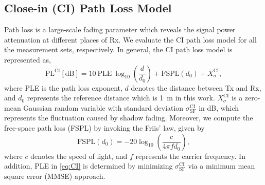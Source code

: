\documentclass[journal,12pt,draftclsnofoot,onecolumn]{IEEEtran}
\begin{document}
\subsection{Close-in (CI) Path Loss Model}
Path loss is a large-scale fading parameter which reveals the signal power attenuation at different places of Rx. We evaluate the CI path loss model for all the measurement sets, respectively. In general, the CI path loss model is represented as,
\begin{equation}
\text{PL}^{\text{CI}}[\text{dB}]=10\ \text{PLE}\ \log_{10}{(\frac{d}{d_0})}+\text{FSPL}(d_0)+X^{\text{CI}}_\sigma,
\label{eq:CI}
\end{equation}
where PLE is the path loss exponent, $d$ denotes the distance between Tx and Rx, and $d_0$ represents the reference distance which is 1~m in this work. $X^{\text{CI}}_\sigma$ is a zero-mean Gaussian random variable with standard deviation $\sigma^{\text{CI}}_{\text{SF}}$ in dB, which represents the fluctuation caused by shadow fading. Moreover, we compute the free-space path loss (FSPL) by invoking the Friis' law, given by
    \begin{equation}
    \text{FSPL}(d_0)=-20\log_{10}(\frac{c}{4\pi fd_0}),
    \label{eq:fspl}
    \end{equation}
where $c$ denotes the speed of light, and $f$ represents the carrier frequency. In addition, PLE in \eqref{eq:CI} is determined by minimizing $\sigma^{\text{CI}}_{\text{SF}}$ via a minimum mean square error (MMSE) approach.
\end{document}
